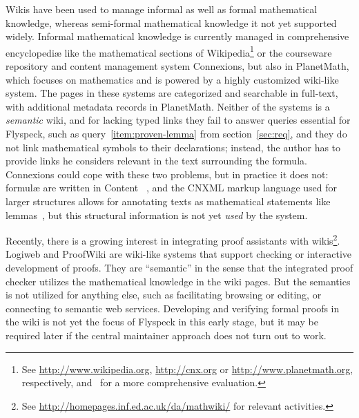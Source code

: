 \label{sec:math-wiki}

Wikis have been used to manage informal as well as formal mathematical knowledge, whereas
semi-formal mathematical knowledge it not yet supported widely.
Informal mathematical knowledge is currently managed in comprehensive encyclopediæ like
the mathematical sections of Wikipedia\footnote{See
  \url{http://www.wikipedia.org}, \url{http://cnx.org} or \url{http://www.planetmath.org},
  respectively, and~\cite{Lange:swmkm-tr07} for a more comprehensive evaluation.} or the
courseware repository and content management system
Connexions\footnotemark[\value{footnote}], but also in
PlanetMath\footnotemark[\value{footnote}], which focuses on mathematics and is
powered by a highly customized wiki-like system.  The pages in these systems are
categorized and searchable in full-text, with additional metadata records in
PlanetMath.  Neither of the systems is a \emph{semantic} wiki, and for lacking
typed links they fail to answer queries essential for Flyspeck, such as
query~\ref{item:proven-lemma} from section~\ref{sec:req}, and they do not link
mathematical symbols to their declarations; instead, the author has to provide links he
considers relevant in the text surrounding the formula.  Connexions could cope
with these two problems, but in practice it does not: formulæ are written in Content
{\mathml}~\cite{CarlisleEd:MathML07}, and the CNXML markup language used for larger
structures allows for annotating texts as mathematical statements like
lemmas~\cite{connexions05:cnxml}, but this structural information is not yet \emph{used}
by the system.

Recently, there is a growing interest in integrating proof assistants
with wikis\footnote{See
  \url{http://homepages.inf.ed.ac.uk/da/mathwiki/} for relevant
  activities.}.  Logiweb and ProofWiki are
wiki-like systems that support checking or interactive development of
proofs. They are ``semantic'' in the sense that the integrated proof
checker utilizes the mathematical knowledge in the wiki pages.  But
the semantics is not utilized for anything else, such as facilitating
browsing or editing, or connecting to semantic web services.
Developing and verifying formal proofs in the wiki is not yet the
focus of Flyspeck in this early stage, but it may be required later if
the central maintainer approach does not turn out to
work.


